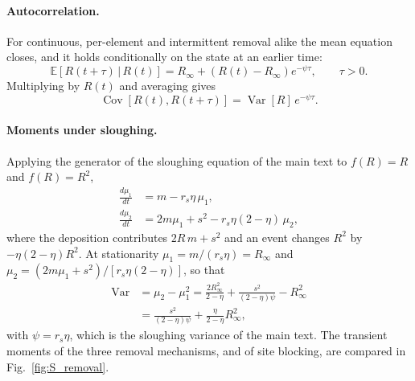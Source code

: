 \documentclass[preprint,12pt]{elsarticle}
\begin{document}
\paragraph*{Autocorrelation.}
For continuous, per-element and intermittent removal alike the mean equation closes, and
it holds conditionally on the state at an earlier time:
\begin{equation}
  \mathbb E[R(t+\tau)\,|\,R(t)]=R_\infty+(R(t)-R_\infty)e^{-\psi\tau},\qquad\tau>0.
\end{equation}
Multiplying by $R(t)$ and averaging gives
\begin{equation}
  \operatorname{Cov}[R(t),R(t+\tau)]=\operatorname{Var}[R]\,e^{-\psi\tau}.
\end{equation}

\label{app:sloughing}
\paragraph*{Moments under sloughing.}
Applying the generator of the sloughing equation of the main text to $f(R)=R$ and $f(R)=R^2$,
\begin{align}
  \frac{d\mu_1}{dt}&=m-r_s\eta\,\mu_1,\label{eq:S_slough_m1}\\
  \frac{d\mu_2}{dt}&=2m\mu_1+s^2-r_s\eta(2-\eta)\,\mu_2,\label{eq:S_slough_m2}
\end{align}
where the deposition contributes $2R\,m+s^2$ and an event changes $R^2$ by
$-\eta(2-\eta)R^2$. At stationarity $\mu_1=m/(r_s\eta)=R_\infty$ and
$\mu_2=(2m\mu_1+s^2)/[r_s\eta(2-\eta)]$, so that
\begin{equation}
\begin{aligned}
  \operatorname{Var}&=\mu_2-\mu_1^2
   =\frac{2R_\infty^2}{2-\eta}+\frac{s^2}{(2-\eta)\psi}-R_\infty^2\\[2pt]
  &=\frac{s^2}{(2-\eta)\psi}+\frac{\eta}{2-\eta}R_\infty^2,
\end{aligned}
\end{equation}
with $\psi=r_s\eta$, which is the sloughing variance of the main text.
The transient moments of the three removal mechanisms, and of site
blocking, are compared in Fig.~\ref{fig:S_removal}.
\end{document}
